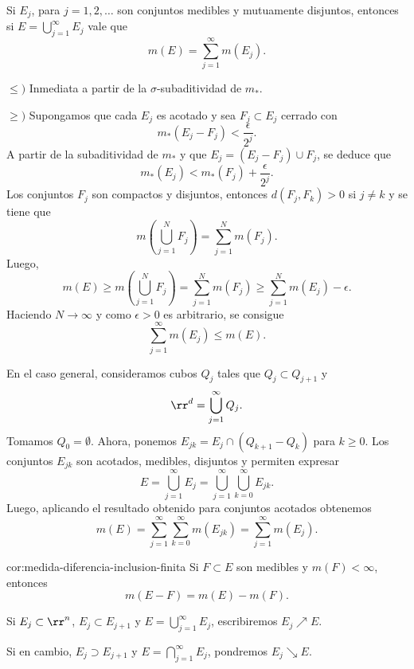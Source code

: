\begin{teorema}{}
Si $E_j$, para $j=1,2,\ldots$ son conjuntos medibles y mutuamente disjuntos, entonces si $E=\bigcup\limits_{j=1}^\infty E_j$ vale que
\[
m( E)=\sum\limits_{j=1}^{\infty} m(E_j).
\]
\end{teorema}

\begin{demo}{}
$\leq)$
Inmediata a partir de la $\sigma$-subaditividad de $m_{*}$.

$\geq )$
Supongamos que cada $E_j$ es acotado y sea $F_j\subset E_j$ cerrado con 
\[
m_{*}(E_j-F_j)<\frac{\epsilon}{2^j}.
\]
A partir de la subaditividad de $m_{*}$ y que $E_j=(E_j-F_j)\cup F_j$, se deduce que
\[
m_{*}(E_j)<m_{*}(F_j)+\frac{\epsilon}{2^j}.\]
Los conjuntos $F_j$ son compactos y disjuntos, entonces
$d(F_j,F_k)>0$ si $j\neq k$ y se tiene que
\[
m\left(\bigcup\limits_{j=1}^{N} F_j\right)=
\sum\limits_{j=1}^N m(F_j).
\]
Luego, 
\[
m(E)\geq m\left( \bigcup\limits_{j=1}^N F_j\right)=
\sum\limits_{j=1}^N m(F_j)\geq \sum\limits_{j=1}^N m(E_j)-\epsilon.
\]
Haciendo $N\to \infty$ y como $\epsilon>0$ es arbitrario, se consigue
\[
\sum\limits_{j=1}^{\infty}m(E_j)\leq m(E).
\]

En el caso general, consideramos cubos $Q_j$ tales que $Q_j\subset Q_{j+1}$ y 
\[
\rr^d=\bigcup\limits_{j=1}^{\infty} Q_j.
\]
Tomamos $Q_0=\emptyset$. Ahora, ponemos $E_{jk}=E_j\cap (Q_{k+1}-Q_{k})$ para $k\geq 0$.
Los conjuntos $E_{jk}$ son acotados, medibles, disjuntos y permiten expresar
\[
E=\bigcup\limits_{j=1}^{\infty} E_j=
\bigcup\limits_{j=1}^{\infty} \bigcup\limits_{k=0}^{\infty} E_{jk}.
\]
Luego, aplicando el resultado obtenido para  conjuntos acotados obtenemos
\[
m(E)=\sum\limits_{j=1}^{\infty}\sum\limits_{k=0}^{\infty}m(E_{jk})=
\sum\limits_{j=1}^{\infty} m(E_j).
\]
\end{demo}

\begin{corolario}{cor:medida-diferencia-inclusion-finita}
Si $F\subset E$ son medibles y $m(F)<\infty$, entonces
\[
m(E-F)=m(E)-m(F).
\]
\end{corolario}

\begin{definicion}{}
Si $E_j\subset \rr^n$, $E_j\subset E_{j+1}$ y $E=\bigcup\limits_{j=1}^{\infty} E_j$, escribiremos $E_j \nearrow E$.

Si en cambio, $E_j\supset E_{j+1}$ y $E=\bigcap\limits_{j=1}^{\infty} E_j$, pondremos $E_j \searrow E$.
\end{definicion}

